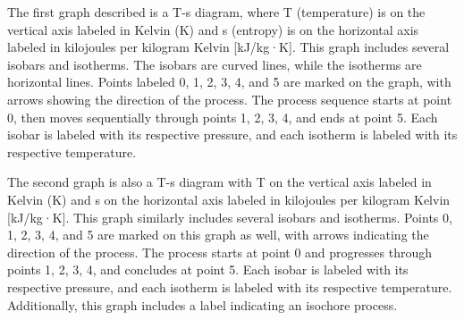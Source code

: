 The first graph described is a T-s diagram, where T (temperature) is on the vertical axis labeled in Kelvin (K) and s (entropy) is on the horizontal axis labeled in kilojoules per kilogram Kelvin [kJ/kg·K]. This graph includes several isobars and isotherms. The isobars are curved lines, while the isotherms are horizontal lines. Points labeled 0, 1, 2, 3, 4, and 5 are marked on the graph, with arrows showing the direction of the process. The process sequence starts at point 0, then moves sequentially through points 1, 2, 3, 4, and ends at point 5. Each isobar is labeled with its respective pressure, and each isotherm is labeled with its respective temperature.

The second graph is also a T-s diagram with T on the vertical axis labeled in Kelvin (K) and s on the horizontal axis labeled in kilojoules per kilogram Kelvin [kJ/kg·K]. This graph similarly includes several isobars and isotherms. Points 0, 1, 2, 3, 4, and 5 are marked on this graph as well, with arrows indicating the direction of the process. The process starts at point 0 and progresses through points 1, 2, 3, 4, and concludes at point 5. Each isobar is labeled with its respective pressure, and each isotherm is labeled with its respective temperature. Additionally, this graph includes a label indicating an isochore process.